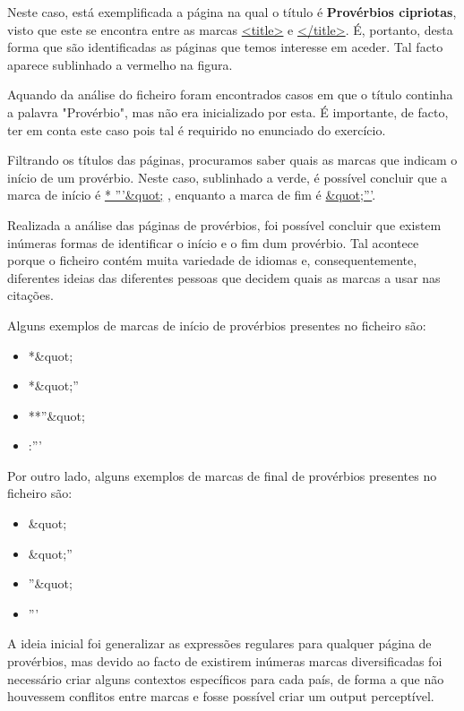 \documentclass[11pt,a4paper]{report}
\begin{document}
Neste caso, está exemplificada a página na qual o título é \textbf{Provérbios cipriotas}, visto que este se encontra entre as marcas \underline{<title>} e \underline{</title>}. É, portanto, desta forma que são identificadas as páginas que temos interesse em aceder. Tal facto aparece sublinhado a vermelho na figura.

Aquando da análise do ficheiro foram encontrados casos em que o título continha a palavra "Provérbio", mas não era inicializado por esta. É importante, de facto, ter em conta este caso pois tal é requirido no enunciado do exercício.

Filtrando os títulos das páginas, procuramos saber quais as marcas que indicam o início de um provérbio. Neste caso, sublinhado a verde, é possível concluir que a marca de início é \underline{* '''\&quot;} , enquanto a marca de fim é \underline{\&quot;'''}.

Realizada a análise das páginas de provérbios, foi possível concluir que existem inúmeras formas de identificar o início e o fim dum provérbio. Tal acontece porque o ficheiro contém muita variedade de idiomas e, consequentemente, diferentes ideias das diferentes pessoas que decidem quais as marcas a usar nas citações.

	\vspace{0.2cm}

Alguns exemplos de marcas de início de provérbios presentes no ficheiro são:
\begin{itemize}
 \item *\&quot;
 \item *\&quot;''
 \item **''\&quot;
 \item :'''
\end{itemize}

	\vspace{0.2cm}

Por outro lado, alguns exemplos de marcas de final de provérbios presentes no ficheiro são:
\begin{itemize}
 \item \&quot;
 \item \&quot;''
 \item ''\&quot;
 \item '''
\end{itemize}

	\vspace{0.2cm}

A ideia inicial foi generalizar as expressões regulares para qualquer página de provérbios, mas devido ao facto de existirem inúmeras marcas diversificadas foi necessário criar alguns contextos específicos para cada país, de forma a que não houvessem conflitos entre marcas e fosse possível criar um output perceptível.
\end{document}
